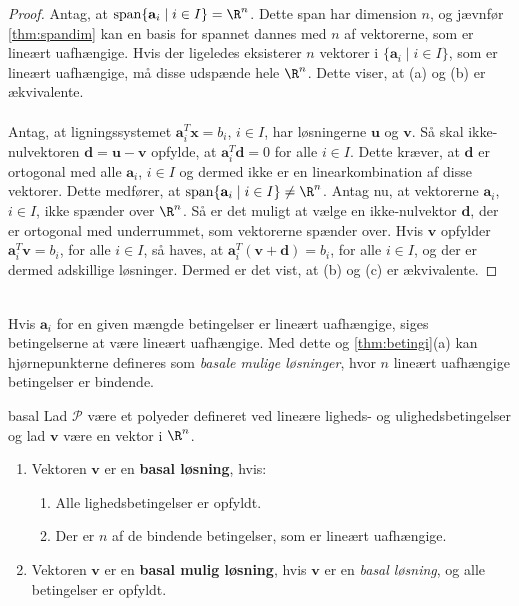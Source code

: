 \begin{proof}
Antag, at $\text{span}\{\textbf{a}_i \mid i \in I\}= \R^n$.
Dette span har dimension $n$, og jævnfør \ref{thm:spandim} %
kan en basis for spannet dannes med $n$ af vektorerne, som er lineært uafhængige.
%
Hvis der ligeledes eksisterer $n$ vektorer i $\{\textbf{a}_i \mid i \in I\}$, som er lineært uafhængige, må disse udspænde hele $\R^n$.
Dette viser, at (a) og (b) er ækvivalente.\\\\
%
Antag, at ligningssystemet $\textbf{a}^T_i\textbf{x}=b_i$, $i \in I$, har løsningerne $\textbf{u}$ og $\textbf{v}$.
Så skal ikke-nulvektoren $\textbf{d} = \textbf{u} - \textbf{v}$ opfylde, at $\textbf{a}^T_i\textbf{d}=0$ for alle $i \in I$.
Dette kræver, at $\textbf{d}$ er ortogonal med alle $\textbf{a}_i$, $i \in I$ og dermed ikke er en linearkombination af disse vektorer.
Dette medfører, at $\text{span}\{\textbf{a}_i \mid i \in I\} \neq \R^n$.
%
Antag nu, at vektorerne $\textbf{a}_i$, $i \in I$, ikke spænder over $\R^n$.
Så er det muligt at vælge en ikke-nulvektor $\textbf{d}$, der er ortogonal med underrummet, som vektorerne spænder over.
Hvis $\textbf{v}$ opfylder  $\textbf{a}^T_i\textbf{v}= b_i$, for alle $i \in I$, så haves, at $\textbf{a}^T_i(\textbf{v}+\textbf{d})= b_i$, for alle $i \in I$, og der er dermed adskillige løsninger.
Dermed er det vist, at (b) og (c) er ækvivalente.
\end{proof}\\
%
Hvis $\textbf{a}_i$ for en given mængde betingelser er lineært uafhængige, siges betingelserne at være lineært uafhængige.
Med dette og \ref{thm:betingi}(a) kan hjørnepunkterne defineres som \textit{basale mulige løsninger}, hvor $n$ lineært uafhængige betingelser er bindende.
%
\begin{defn}{}{basal}
Lad $\mathcal{P}$ være et polyeder defineret ved lineære ligheds- og ulighedsbetingelser og lad $\textbf{v}$ være en vektor i $\R^n$.
%
\begin{enumerate}[label=(\alph*)]
\item Vektoren $\textbf{v}$ er en \textbf{basal løsning}, hvis:
%
\begin{enumerate}[label=(\roman*)]
\item Alle lighedsbetingelser er opfyldt.
\item Der er $n$ af de bindende betingelser, som er lineært uafhængige.
\end{enumerate}
%
\item Vektoren $\textbf{v}$ er en \textbf{basal mulig løsning}, hvis $\textbf{v}$ er en \textit{basal løsning}, og alle betingelser er opfyldt.
\end{enumerate}
\end{defn}\noindent
